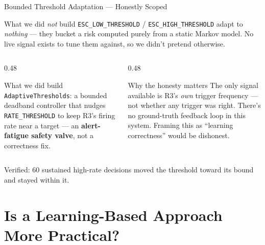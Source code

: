 \documentclass[aspectratio=169, 12pt]{beamer}
\begin{document}
\begin{frame}{Bounded Threshold Adaptation — Honestly Scoped}
  \begin{alertblock}{What we did \emph{not} build}
    \texttt{ESC\_LOW\_THRESHOLD} / \texttt{ESC\_HIGH\_THRESHOLD} adapt to
    \emph{nothing} — they bucket a risk computed purely from a static
    Markov model. No live signal exists to tune them against, so we
    didn't pretend otherwise.
  \end{alertblock}
  \vspace{0.3cm}
  \begin{columns}[T]
    \begin{column}{0.48\textwidth}
      \begin{block}{What we did build}
        \texttt{AdaptiveThresholds}: a bounded deadband controller that
        nudges \texttt{RATE\_THRESHOLD} to keep R3's firing rate near a
        target — an \textbf{alert-fatigue safety valve}, not a
        correctness fix.
      \end{block}
    \end{column}
    \begin{column}{0.48\textwidth}
      \begin{exampleblock}{Why the honesty matters}
        The only signal available is R3's \emph{own} trigger frequency
        — not whether any trigger was right. There's no ground-truth
        feedback loop in this system. Framing this as ``learning
        correctness'' would be dishonest.
      \end{exampleblock}
    \end{column}
  \end{columns}
  \vspace{0.2cm}
  \begin{center}
    \textcolor{honeyblue}{\small Verified: 60 sustained high-rate decisions moved the
    threshold toward its bound and stayed within it.}
  \end{center}
\end{frame}

\section{Is a Learning-Based Approach More Practical?}
\end{document}
